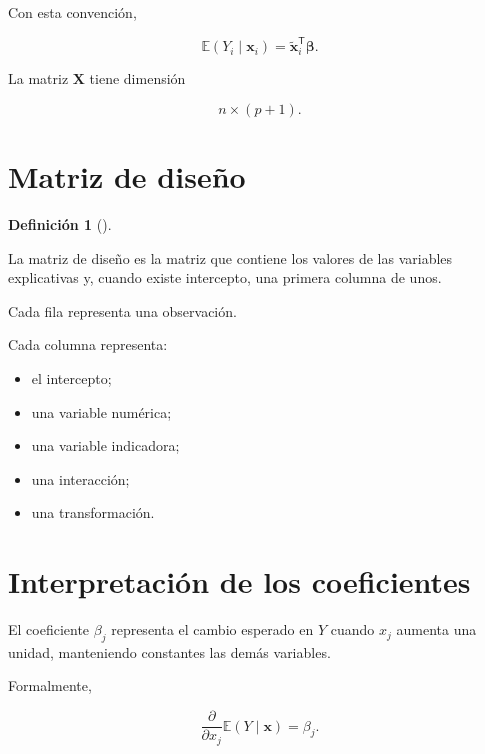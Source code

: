 \documentclass[
  spanish,
  10.5pt,
  letterpaper,
  DIV=11,
  numbers=noendperiod,
  oneside,
  open=any]{scrreprt}
\providecommand{\tightlist}{%
  \setlength{\itemsep}{0pt}\setlength{\parskip}{0pt}}
\theoremstyle{definition}
\newtheorem{definition}{Definición}[chapter]
\theoremstyle{definition}
\theoremstyle{plain}
\theoremstyle{remark}
\begin{document}
Con esta convención,

\[
\mathbb{E}(Y_i\mid\mathbf{x}_i)
=
\widetilde{\mathbf{x}}_i^{\mathsf T}
\boldsymbol{\beta}.
\]

La matriz \(\mathbf{X}\) tiene dimensión

\[
n\times(p+1).
\]

\section*{Matriz de diseño}\label{matriz-de-diseuxf1o}


\begin{definition}[]\protect\hypertarget{def-matriz-diseno}{}\label{def-matriz-diseno}

La matriz de diseño es la matriz que contiene los valores de las
variables explicativas y, cuando existe intercepto, una primera columna
de unos.

\end{definition}

Cada fila representa una observación.

Cada columna representa:

\begin{itemize}
\tightlist
\item
  el intercepto;
\item
  una variable numérica;
\item
  una variable indicadora;
\item
  una interacción;
\item
  una transformación.
\end{itemize}

\section*{Interpretación de los
coeficientes}\label{interpretaciuxf3n-de-los-coeficientes}


El coeficiente \(\beta_j\) representa el cambio esperado en \(Y\) cuando
\(x_j\) aumenta una unidad, manteniendo constantes las demás variables.

Formalmente,

\[
\frac{\partial}{\partial x_j}
\mathbb{E}(Y\mid\mathbf{x})
=
\beta_j.
\]
\end{document}
